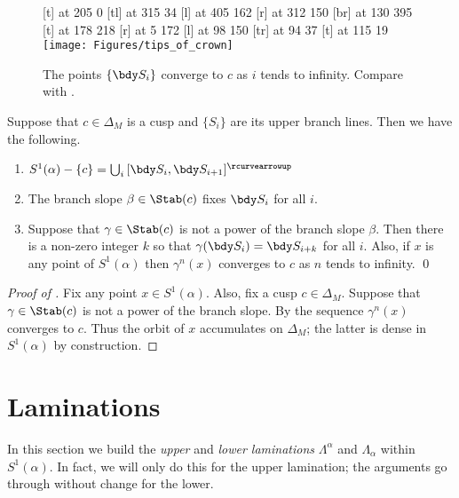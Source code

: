 \documentclass[12pt]{amsart}
\newcommand{\acw}{\rcurvearrowup}
\begin{document}
\begin{figure}[htbp]
\small\hair 2pt
 [t] at 205 0 
 [tl] at 315 34
 [l] at 405 162
 [r] at 312 150
 [br] at 130 395
 [t] at 178 218  
 [r] at 5 172
 [l] at 98 150
 [tr] at 94 37
 [t] at 115 19
\endlabellist
\texttt{[image: Figures/tips\_of\_crown]}
\caption{The points $\{\bdy S_i\}$ converge to $c$ as $i$ tends to infinity. Compare with .}
\label{Fig:TipsOfCrown}
\end{figure}

\begin{lemma}
\label{Lem:Parabolics}
Suppose that $c \in \Delta_M$ is a cusp and $\{S_i\}$ are its upper branch lines.  Then we have the following. 
\begin{enumerate}
\item
\label{Itm:TipsOfCrown}
$S^1(\alpha) - \{ c \} = \bigcup_i \, [\bdy S_i, \bdy S_{i+1}]^\acw$  
\item
\label{Itm:BranchSlope}
The branch slope $\beta \in \Stab(c)$ fixes $\bdy S_i$ for all $i$.  
\item
\label{Itm:NonBranchSlope}
Suppose that $\gamma \in \Stab(c)$ is not a power of the branch slope $\beta$.  Then there is a non-zero integer $k$ so that $\gamma(\bdy S_i) = \bdy S_{i + k}$ for all $i$.  Also, if $x$ is any point of $S^1(\alpha)$ then $\gamma^n(x)$ converges to $c$ as $n$ tends to infinity. \qed
\end{enumerate}
\end{lemma}

\begin{proof}[Proof of ]
Fix any point $x \in S^1(\alpha)$.  Also, fix a cusp $c \in \Delta_M$.  Suppose that $\gamma \in \Stab(c)$ is not a power of the branch slope.  By  the sequence $\gamma^n(x)$  converges to $c$.  Thus the orbit of $x$ accumulates on $\Delta_M$; the latter is dense in $S^1(\alpha)$ by construction.  
\end{proof}

\section{Laminations}
\label{Sec:LaminationsAlone}

In this section we build the \emph{upper} and \emph{lower laminations} $\Lambda^\alpha$ and $\Lambda_\alpha$ within $S^1(\alpha)$.  In fact, we will only do this for the upper lamination; the arguments go through without change for the lower.
\end{document}
